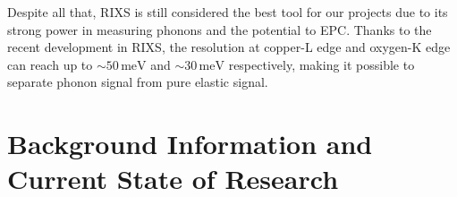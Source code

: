 \documentclass[11pt]{article}
\begin{document}

Despite all that, RIXS is still considered the best tool for our projects due to its strong power in measuring phonons and the potential to EPC. Thanks to the recent development in RIXS, the resolution at copper-L edge and oxygen-K edge can reach up to $\sim 50\,\mathrm{meV}$ and $\sim 30\,\mathrm{meV}$ respectively, making it possible to separate phonon signal from pure elastic signal. 



\section{Background Information and Current State of Research}
\end{document}
